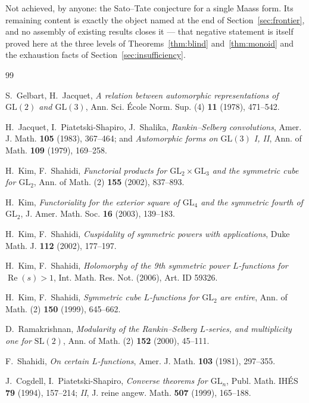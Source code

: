 \documentclass[11pt]{article}
\theoremstyle{definition}
\theoremstyle{remark}
\newcommand{\GL}{\mathrm{GL}}
\renewcommand{\Re}{\operatorname{Re}}
\begin{document}
Not achieved, by anyone: the Sato--Tate conjecture for a single Maass form.
Its remaining content is exactly the object named at the end of
Section~\ref{sec:frontier}, and no assembly of existing results closes it ---
that negative statement is itself proved here at the three levels of
Theorems~\ref{thm:blind} and~\ref{thm:monoid} and the exhaustion facts of
Section~\ref{sec:insufficiency}.

\begin{thebibliography}{99}

 S.~Gelbart, H.~Jacquet,
\emph{A relation between automorphic representations of $\GL(2)$ and
$\GL(3)$}, Ann. Sci. \'Ecole Norm. Sup. (4) \textbf{11} (1978), 471--542.

 H.~Jacquet, I.~Piatetski-Shapiro, J.~Shalika,
\emph{Rankin--Selberg convolutions}, Amer. J. Math. \textbf{105} (1983),
367--464; and \emph{Automorphic forms on $\GL(3)$ I, II}, Ann. of Math.
\textbf{109} (1979), 169--258.

 H.~Kim, F.~Shahidi,
\emph{Functorial products for $\GL_2\times\GL_3$ and the symmetric cube for
$\GL_2$}, Ann. of Math. (2) \textbf{155} (2002), 837--893.

 H.~Kim,
\emph{Functoriality for the exterior square of $\GL_4$ and the symmetric
fourth of $\GL_2$}, J. Amer. Math. Soc. \textbf{16} (2003), 139--183.

 H.~Kim, F.~Shahidi,
\emph{Cuspidality of symmetric powers with applications}, Duke Math. J.
\textbf{112} (2002), 177--197.

 H.~Kim, F.~Shahidi,
\emph{Holomorphy of the 9th symmetric power $L$-functions for
$\Re(s)>1$}, Int. Math. Res. Not. (2006), Art. ID 59326.

 H.~Kim, F.~Shahidi,
\emph{Symmetric cube $L$-functions for $\GL_2$ are entire}, Ann. of Math.
(2) \textbf{150} (1999), 645--662.

 D.~Ramakrishnan,
\emph{Modularity of the Rankin--Selberg $L$-series, and multiplicity one for
$\mathrm{SL}(2)$}, Ann. of Math. (2) \textbf{152} (2000), 45--111.

 F.~Shahidi,
\emph{On certain $L$-functions}, Amer. J. Math. \textbf{103} (1981),
297--355.

 J.~Cogdell, I.~Piatetski-Shapiro,
\emph{Converse theorems for $\GL_n$}, Publ. Math. IH\'ES \textbf{79} (1994),
157--214; \emph{II}, J. reine angew. Math. \textbf{507} (1999), 165--188.


\end{thebibliography}
\end{document}
